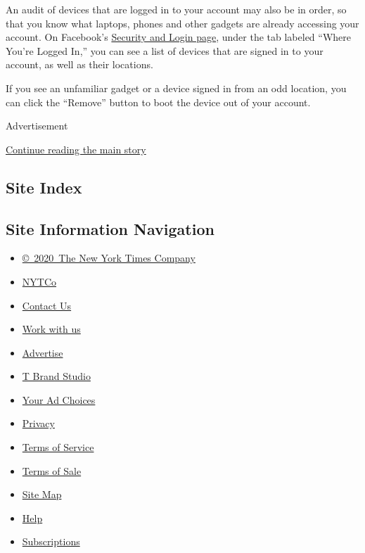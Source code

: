 An audit of devices that are logged in to your account may also be in
order, so that you know what laptops, phones and other gadgets are
already accessing your account. On Facebook's
\href{https://www.facebook.com/settings?tab=security}{Security and Login
page}, under the tab labeled ``Where You're Logged In,'' you can see a
list of devices that are signed in to your account, as well as their
locations.

If you see an unfamiliar gadget or a device signed in from an odd
location, you can click the ``Remove'' button to boot the device out of
your account.

Advertisement

\protect\hyperlink{after-bottom}{Continue reading the main story}

\hypertarget{site-index}{%
\subsection{Site Index}\label{site-index}}

\hypertarget{site-information-navigation}{%
\subsection{Site Information
Navigation}\label{site-information-navigation}}

\begin{itemize}
\tightlist
\item
  \href{https://help.nytimes.com/hc/en-us/articles/115014792127-Copyright-notice}{©~2020~The
  New York Times Company}
\end{itemize}

\begin{itemize}
\tightlist
\item
  \href{https://www.nytco.com/}{NYTCo}
\item
  \href{https://help.nytimes.com/hc/en-us/articles/115015385887-Contact-Us}{Contact
  Us}
\item
  \href{https://www.nytco.com/careers/}{Work with us}
\item
  \href{https://nytmediakit.com/}{Advertise}
\item
  \href{http://www.tbrandstudio.com/}{T Brand Studio}
\item
  \href{https://www.nytimes.com/privacy/cookie-policy\#how-do-i-manage-trackers}{Your
  Ad Choices}
\item
  \href{https://www.nytimes.com/privacy}{Privacy}
\item
  \href{https://help.nytimes.com/hc/en-us/articles/115014893428-Terms-of-service}{Terms
  of Service}
\item
  \href{https://help.nytimes.com/hc/en-us/articles/115014893968-Terms-of-sale}{Terms
  of Sale}
\item
  \href{https://spiderbites.nytimes.com}{Site Map}
\item
  \href{https://help.nytimes.com/hc/en-us}{Help}
\item
  \href{https://www.nytimes.com/subscription?campaignId=37WXW}{Subscriptions}
\end{itemize}
